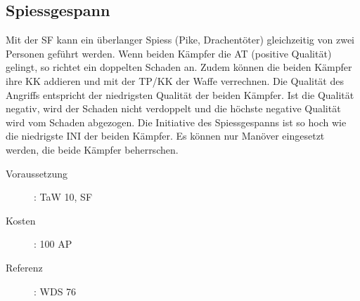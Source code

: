 \subsection{Spiessgespann}
\label{sf.spiessgespann}
Mit der SF  kann ein überlanger Spiess (Pike, Drachentöter) gleichzeitig von zwei Personen geführt werden.
Wenn beiden Kämpfer die AT (positive Qualität) gelingt, so richtet ein  doppelten Schaden an.
Zudem können die beiden Kämpfer ihre KK addieren und mit der TP/KK der Waffe verrechnen.
Die Qualität des Angriffs entspricht der niedrigsten Qualität der beiden Kämpfer.
Ist die Qualität negativ, wird der Schaden nicht verdoppelt und die höchste negative Qualität wird vom Schaden abgezogen.
Die Initiative des Spiessgespanns ist so hoch wie die niedrigste INI der beiden Kämpfer.
Es können nur Manöver eingesetzt werden, die beide Kämpfer beherrschen.
\begin{description}
    \item[Voraussetzung]:
        TaW  10, SF 
    \item [Kosten]:
        100 AP
    \item [Referenz]:
        WDS 76
\end{description}

